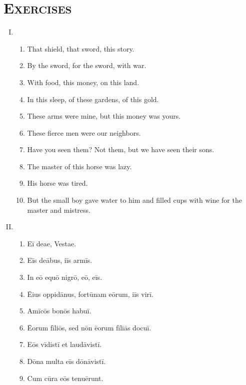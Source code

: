 \documentclass[12pt]{article}
\begin{document}
\section{\textsc{Exercises}}
\begin{enumerate}[I.]
	\setlength{\itemsep}{1em}
	\item \begin{enumerate}[1)]
		\item That shield, that sword, this story.
		\item By the sword, for the sword, with war.
		\item With food, this money, on this land.
		\item In this sleep, of these gardens, of this gold.
		\item These arms were mine, but this money was yours.
		\item These fierce men were our neighbors.
		\item Have you seen them? Not them, but we have seen their sons.
		\item The master of this horse was lazy.
		\item His horse was tired.
		\item But the small boy gave water to him and filled cups with wine for the master and mistress.
	\end{enumerate}
	\item \begin{enumerate}[1)]
		\item Eī deae, Vestae.
		\item Eīs deābus, iīs armīs.
		\item In eō equō nigrō, eō, eīs.
		\item Ēius oppidānus, fortūnam eōrum, iīs virī.
		\item Amīcōs bonōs habuī.
		\item Ēorum fīliōs, sed nōn ēorum fīliās docuī.
		\item Eōs vīdistī et laudāvistī.
		\item Dōna multa eīs dōnāvistī.
		\item Cum cūra eōs tenuērunt.
	\end{enumerate}
\end{enumerate}
\end{document}
